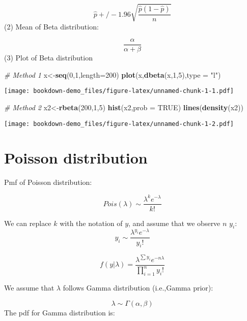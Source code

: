 \documentclass[
]{book}
\newenvironment{Shaded}{\begin{snugshade}}{\end{snugshade}}
\newcommand{\CommentTok}[1]{\textcolor[rgb]{0.56,0.35,0.01}{\textit{#1}}}
\newcommand{\DataTypeTok}[1]{\textcolor[rgb]{0.13,0.29,0.53}{#1}}
\newcommand{\DecValTok}[1]{\textcolor[rgb]{0.00,0.00,0.81}{#1}}
\newcommand{\KeywordTok}[1]{\textcolor[rgb]{0.13,0.29,0.53}{\textbf{#1}}}
\newcommand{\NormalTok}[1]{#1}
\newcommand{\OtherTok}[1]{\textcolor[rgb]{0.56,0.35,0.01}{#1}}
\newcommand{\StringTok}[1]{\textcolor[rgb]{0.31,0.60,0.02}{#1}}
\begin{document}
\[\hat{p} +/- 1.96 \sqrt{\frac{\hat{p}(1-\hat{p})}{n}}\]
(2) Mean of Beta distribution:

\[\frac{\alpha}{\alpha+\beta}\]
(3) Plot of Beta distribution

\begin{Shaded}
\begin{Highlighting}[]
\CommentTok{# Method 1}
\NormalTok{x<-}\KeywordTok{seq}\NormalTok{(}\DecValTok{0}\NormalTok{,}\DecValTok{1}\NormalTok{,}\DataTypeTok{length=}\DecValTok{200}\NormalTok{)}
\KeywordTok{plot}\NormalTok{(x,}\KeywordTok{dbeta}\NormalTok{(x,}\DecValTok{1}\NormalTok{,}\DecValTok{5}\NormalTok{),}\DataTypeTok{type =} \StringTok{"l"}\NormalTok{)}
\end{Highlighting}
\end{Shaded}

\texttt{[image: bookdown-demo\_files/figure-latex/unnamed-chunk-1-1.pdf]}

\begin{Shaded}
\begin{Highlighting}[]
\CommentTok{# Method 2}
\NormalTok{x2<-}\KeywordTok{rbeta}\NormalTok{(}\DecValTok{200}\NormalTok{,}\DecValTok{1}\NormalTok{,}\DecValTok{5}\NormalTok{)}
\KeywordTok{hist}\NormalTok{(x2,}\DataTypeTok{prob =} \OtherTok{TRUE}\NormalTok{)}
\KeywordTok{lines}\NormalTok{(}\KeywordTok{density}\NormalTok{(x2))}
\end{Highlighting}
\end{Shaded}

\texttt{[image: bookdown-demo\_files/figure-latex/unnamed-chunk-1-2.pdf]}

\hypertarget{poisson-distribution}{%
\section{Poisson distribution}\label{poisson-distribution}}

Pmf of Poisson distribution:

\[Pois (\lambda) \sim \frac{\lambda^k e^{-\lambda}}{k!}\]

We can replace \(k\) with the notation of \(y\), and assume that we observe \(n\) \(y_i\):
\[y_i \sim \frac{\lambda^{y_i} e^{-\lambda}}{y_i!}\]

\[f(y|\lambda)=\frac{\lambda^{\sum y_i} e^{- n \lambda}}{\prod_{i=1}^n y_i !}\]

We assume that \(\lambda\) follows Gamma distribution (i.e.,Gamma prior):

\[\lambda \sim \Gamma(\alpha, \beta)\]
The pdf for Gamma distribution is:
\end{document}
